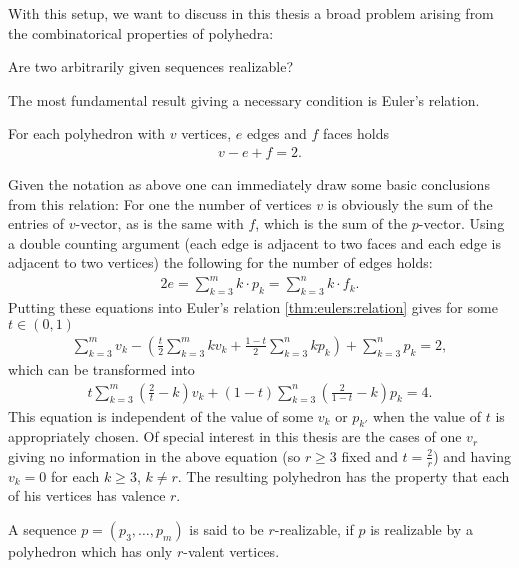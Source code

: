 With this setup, we want to discuss in this thesis a broad problem arising from the combinatorical properties of polyhedra:
\begin{problem} Are two arbitrarily given sequences realizable?
\end{problem}
The most fundamental result giving a necessary condition is Euler's relation.
\begin{theorem}\label{thm:eulers:relation}
  For each polyhedron with $v$ vertices, $e$ edges and $f$ faces holds
  \begin{align*}
    v - e + f = 2.
  \end{align*}
\end{theorem}
Given the notation as above one can immediately draw some basic conclusions from this relation: For one the number of vertices $v$ is obviously the sum of the entries of $v$-vector, as is the same with $f$, which is the sum of the $p$-vector. Using a double counting argument (each edge is adjacent to two faces and each edge is adjacent to two vertices) the following for the number of edges holds:
\begin{align*}
  2e = \sum_{k=3}^{m} k \cdot p_k = \sum_{k=3}^{n} k \cdot f_k.
\end{align*}
Putting these equations into Euler's relation \autoref{thm:eulers:relation} gives for some $t \in (0, 1)$
\begin{align*}
  \sum_{k=3}^m v_k - \left(\frac{t}{2} \sum_{k=3}^m k v_k + \frac{1-t}{2} \sum_{k=3}^n k p_k \right) + \sum_{k=3}^n p_k = 2,
\end{align*}
which can be transformed into
\begin{align}
  t \sum_{k=3}^m \left(\frac{2}{t} - k \right) v_k + (1-t) \sum_{k=3}^n \left( \frac{2}{1-t} - k \right) p_k = 4. \label{eq:general:vp:relation}
\end{align}
This equation is independent of the value of some $v_k$ or $p_{k'}$ when the value of $t$ is appropriately chosen. Of special interest in this thesis are the cases of one $v_r$ giving no information in the above equation (so $r \geq 3$ fixed and $t = \frac{2}{r}$) and having $v_{k} = 0$ for each $k \geq 3$, $k \neq r$. The resulting polyhedron has the property that each of his vertices has valence $r$.
\begin{definition}[$r$-realizable]\label{def:r:realizable}
  A sequence $p = (p_3, \dots, p_m)$ is said to be $r$-realizable, if $p$ is realizable by a polyhedron which has only $r$-valent vertices.
\end{definition}
